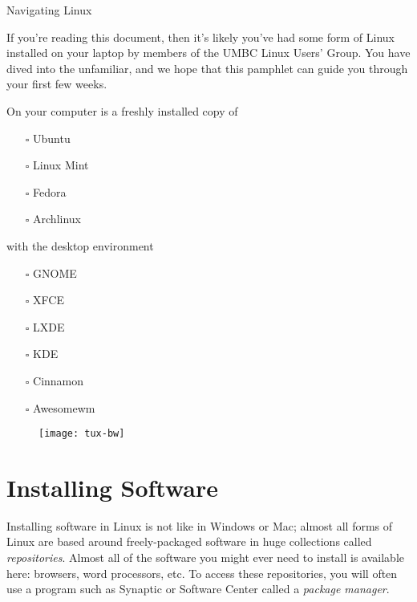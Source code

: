 \documentclass[11pt,notumble]{leaflet}
\begin{document}
\begin{center} \LARGE
    Navigating Linux
\end{center}

If you're reading this document, then it's likely you've had some form of Linux
installed on your laptop by members of the UMBC Linux Users' Group. You have
dived into the unfamiliar, and we hope that this pamphlet can guide you through
your first few weeks.

On your computer is a freshly installed copy of
\begin{multicols}{2}
\begin{itemize}
    \item[$\square$] Ubuntu
    \item[$\square$] Linux Mint
    \item[$\square$] Fedora
    \item[$\square$] Archlinux
\end{itemize}
\end{multicols}
with the desktop environment
\begin{multicols}{2}
\begin{itemize}
    \item[$\square$] GNOME
    \item[$\square$] XFCE
    \item[$\square$] LXDE
    \item[$\square$] KDE
    \item[$\square$] Cinnamon
    \item[$\square$] Awesomewm
\end{itemize}
\end{multicols}

\vfill

\begin{figure}[hb]
    \centering
    \texttt{[image: tux-bw]}
\end{figure}

\pagebreak

\section{Installing Software}

Installing software in Linux is not like in Windows or Mac; almost all forms of
Linux are based around freely-packaged software in huge collections called
\emph{repositories}. Almost all of the software you might ever need to install
is available here: browsers, word processors, etc. To access these repositories,
you will often use a program such as Synaptic or Software Center called a
\emph{package manager}.
\end{document}
